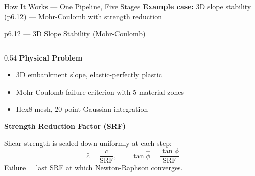 \documentclass[aspectratio=169]{beamer}
\begin{document}
\begin{frame}{How It Works --- One Pipeline, Five Stages}
    \vspace{0.3cm}
    \centering
    {\small \textbf{Example case:} 3D slope stability (p6.12) --- Mohr-Coulomb with strength reduction}
\end{frame}


\begin{frame}[shrink=5]{p6.12 --- 3D Slope Stability (Mohr-Coulomb)}
    \begin{columns}[t]
        \begin{column}{0.54\textwidth}
            \textbf{Physical Problem}
            \begin{itemize}
                \setlength\itemsep{0.3em}
                \item 3D embankment slope, elastic-perfectly plastic
                \item Mohr-Coulomb failure criterion with 5 material zones
                \item Hex8 mesh, 20-point Gaussian integration
            \end{itemize}

            \vspace{0.4cm}
            \textbf{Strength Reduction Factor (SRF)}

            Shear strength is scaled down uniformly at each step:
            \[
                \hat{c} = \frac{c}{\text{SRF}}, \qquad
                \tan\hat{\phi} = \frac{\tan\phi}{\text{SRF}}
            \]
            Failure = last SRF at which Newton-Raphson converges.


\end{column}
\end{columns}
\end{frame}
\end{document}
